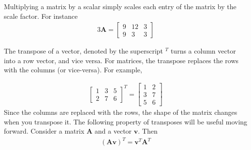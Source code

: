 Multiplying a matrix by a scalar simply scales each entry of the matrix by the scale factor. For instance
\begin{align}
3 \mathbf{A} = \begin{bmatrix}
9 & 12 & 3\\
9 & 3 & 3
\end{bmatrix}
\end{align}

The transpose of a vector, denoted by the superscript $^T$ turns a column vector into a row vector, and vice versa. For matrices, the transpose replaces the rows with the columns (or vice-versa).  For example,

\begin{align}
\begin{bmatrix}
1 & 3 & 5 \\
2 & 7 & 6
\end{bmatrix}^T =
\begin{bmatrix}
1 & 2 \\
3 & 7 \\
5 & 6
\end{bmatrix}
\end{align}
Since the columns are replaced with the rows, the shape of the matrix changes when you transpose it.  The following property of transposes will be useful moving forward. Consider a matrix $\mathbf{A}$ and a vector $\mathbf{v}$. Then
\begin{align}
\left(\mathbf{Av}\right)^T = \mathbf{v}^T \mathbf{A}^T
\end{align}


